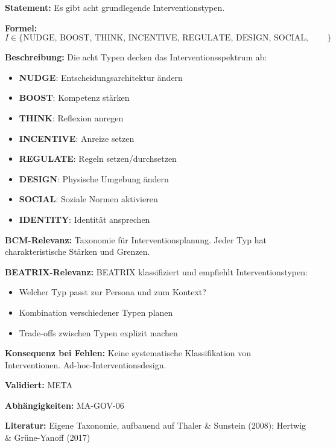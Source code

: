 \textbf{Statement:} Es gibt acht grundlegende Interventionstypen.

\textbf{Formel:}
\begin{equation}
I \in \{\text{NUDGE, BOOST, THINK, INCENTIVE, REGULATE, DESIGN, SOCIAL, IDENTITY}\}
\end{equation}

\textbf{Beschreibung:}
Die acht Typen decken das Interventionsspektrum ab:
\begin{itemize}
    \item \textbf{NUDGE}: Entscheidungsarchitektur ändern
    \item \textbf{BOOST}: Kompetenz stärken
    \item \textbf{THINK}: Reflexion anregen
    \item \textbf{INCENTIVE}: Anreize setzen
    \item \textbf{REGULATE}: Regeln setzen/durchsetzen
    \item \textbf{DESIGN}: Physische Umgebung ändern
    \item \textbf{SOCIAL}: Soziale Normen aktivieren
    \item \textbf{IDENTITY}: Identität ansprechen
\end{itemize}

\textbf{BCM-Relevanz:}
Taxonomie für Interventionsplanung. Jeder Typ hat charakteristische Stärken und Grenzen.

\textbf{BEATRIX-Relevanz:}
BEATRIX klassifiziert und empfiehlt Interventionstypen:
\begin{itemize}
    \item Welcher Typ passt zur Persona und zum Kontext?
    \item Kombination verschiedener Typen planen
    \item Trade-offs zwischen Typen explizit machen
\end{itemize}

\textbf{Konsequenz bei Fehlen:}
Keine systematische Klassifikation von Interventionen. Ad-hoc-Interventionsdesign.

\textbf{Validiert:} META

\textbf{Abhängigkeiten:} MA-GOV-06

\textbf{Literatur:} Eigene Taxonomie, aufbauend auf Thaler \& Sunstein (2008); Hertwig \& Grüne-Yanoff (2017)


